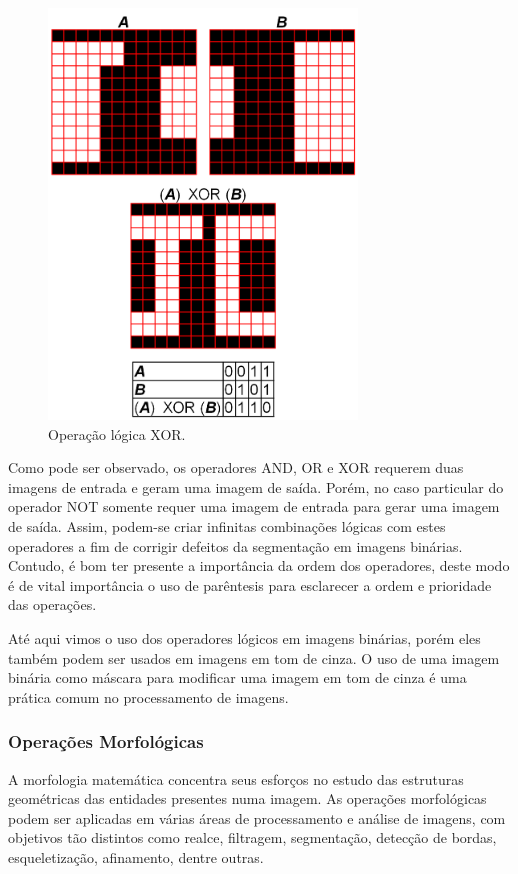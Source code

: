 \begin{figure} [h]
  \begin{center}
    \includegraphics[height=309pt,width=233pt]{images/fig_logic-xor}
    \caption{Operação lógica XOR.}\label{fig:logic-xor}
  \end{center}
\end{figure}

Como pode ser observado, os operadores AND, OR e XOR requerem duas
imagens de entrada e geram uma imagem de saída. Porém, no caso
particular do operador NOT somente requer uma imagem de entrada para
gerar uma imagem de saída. Assim, podem-se criar infinitas combinações
lógicas com estes operadores a fim de corrigir defeitos da segmentação
em imagens binárias. Contudo, é bom ter presente a importância da
ordem dos operadores, deste modo é de vital importância o uso de
parêntesis para esclarecer a ordem e prioridade das operações.

Até aqui vimos o uso dos operadores lógicos em imagens binárias, porém
eles também podem ser usados em imagens em tom de cinza. O uso de uma
imagem binária como máscara para modificar uma imagem em tom de cinza
é uma prática comum no processamento de imagens.

\subsubsection{Operações Morfológicas}

A morfologia matemática concentra seus esforços no estudo das
estruturas geométricas das entidades presentes numa imagem.\cite{111}
As operações morfológicas podem ser aplicadas em várias áreas de
processamento e análise de imagens, com objetivos tão distintos como
realce, filtragem, segmentação, detecção de bordas, esqueletização,
afinamento, dentre outras.\cite{91}

